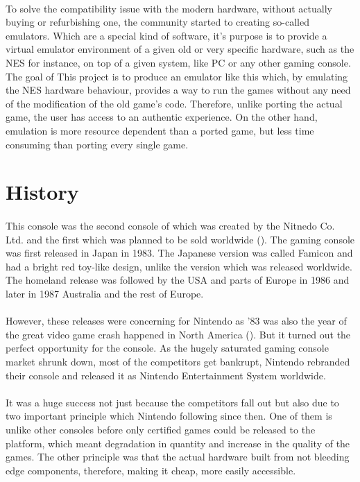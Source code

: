 \documentclass[]{report}
\begin{document}
\paragraph{ }
To solve the compatibility issue with the modern hardware, without actually buying or refurbishing one, the community started to creating so-called emulators. Which are a special kind of software, it's purpose is to provide a virtual emulator environment of a given old or very specific hardware, such as the NES for instance, on top of a given system, like PC or any other gaming console. The goal of This project is to produce an emulator like this which, by emulating the NES hardware behaviour, provides a way to run the games without any need of the modification of the old game's code. Therefore, unlike porting the actual game, the user has access to an authentic experience. On the other hand, emulation is more resource dependent than a ported game, but less time consuming than porting every single game.

\section{History}

\paragraph{ }
 This console was the second console of which was created by the Nitnedo Co. Ltd. and the first which was planned to be sold worldwide (\cite{HIST}).
The gaming console was first released in Japan in 1983. The Japanese version was called Famicon and had a bright red toy-like design, unlike the version which was released worldwide.
The homeland release was followed by the USA and parts of Europe in 1986 and later in 1987 Australia and the rest of Europe.
\paragraph{ }
However, these releases were concerning for Nintendo as '83 was also the year of the great video game crash happened in North America (\cite{CRSH}). But it turned out the perfect opportunity for the console. As the hugely saturated gaming console market shrunk down, most of the competitors get bankrupt, Nintendo rebranded their console and released it as Nintendo Entertainment System worldwide.
\paragraph{ }
 It was a huge success not just because the competitors fall out but also due to two important principle which Nintendo following since then. One of them is unlike other consoles before only certified games could be released to the platform, which meant degradation in quantity and increase in the quality of the games. The other principle was that the actual hardware built from not bleeding edge components, therefore, making it cheap, more easily accessible.
 
\end{document}
